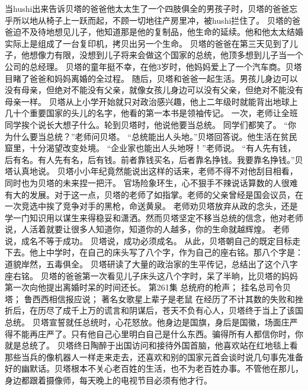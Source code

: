 \documentclass[a4paper,12pt,UTF8,twoside]{ctexbook}
\begin{document}
        当hushi出来告诉贝塔的爸爸他太太生了一个四肢俱全的男孩子时，贝塔的爸爸忘乎所以地从椅子上一跃而起，不顾一切地往产房里冲，被hushi拦住了。  
        贝塔的爸爸迫不及待地想见儿子，他知道那是他的复制品，他生命的延续。他和他太太结婚实际上是组成了一台复印机，拷贝出另一个生命。  
        贝塔的爸爸在第三天见到了儿子，他想像力有限，没想到儿子将来会做这个国家的总统，他顶多想到儿子当一个公司的总经理。  
        贝塔的童年挺不幸，在他3岁时，他妈妈爱上了一个汽车商。贝塔目睹了爸爸和妈妈离婚的全过程。  
        随后，贝塔和爸爸一起生活。男孩儿身边可以没有母亲，但绝对不能没有父亲，就像女孩儿身边可以没有父亲，但绝对不能没有母亲一样。  
        贝塔从上小学开始就只对政治感兴趣，他上二年级时就能背出地球上几十个重要国家的头儿的名字，他看的第一本书是领袖传记。  
        一次，老师让全班同学挨个说长大想子什么。轮到贝塔时，他说他要当总统。  
        同学们都笑了。  
        “你为什么要当总统？”老师问贝塔。  
        “总统能出人头地。”贝塔回答说。他生活在贫民窟里，十分渴望改变处境。  
        “企业家也能出人头地呀！”老师说。  
        “有人先有钱，后有名。有人先有名，后有钱。前者靠钱买名，后者靠名挣钱。我要靠名挣钱。”贝塔认真地说。  
        贝塔小小年纪竟然能说出这样的话来，老师不得不对他刮目相看，同时也为贝塔的未来捏一把汗。  
        官场险象环生，心不狠手不辣说话算数的人很难有大的发展。对于这一点，贝塔的老师了如指掌。老师的父亲曾经是国会议员，在一次竞选中挨了竞争对手的黑枪，命送黄泉。  
        老师劝贝塔放弃从政的念头，还是学一门知识用以谋生来得稳妥和潇洒。然而贝塔坚定不移当总统的信念，他对老师说，人活着就要让很多人知道你，知道你的人越多，你的生命就越辉煌。  
        老师说，成名不等于成功。  
        贝塔说，成功必须成名。  
        从此，贝塔朝自己的既定目标走下去。他上中学时，在自己的床头写了八个字，作为自己的座右铭。那八个字是：道貌岸然，五毒俱全。  
        贝塔研读了大量的政治家的生平传记，总结出了这个八字座右铭。  
        贝塔的爸爸第一次看见儿子床头这八个字时，呆了半晌，比贝塔的妈妈第一次向他提出离婚时呆的时间还长。          第261集  
        总统府的枪声；  
        挂名总司令贝塔；  
        鲁西西相信报应说；  
        著名女歌星上辈子是老鼠    
        在经历了不计其数的失败和挫折后，在历尽了成千上万的谎言和阴谋后，苍天不负有心人，贝塔终于当上了该国总统。  
        贝塔宣誓就任总统时，心花怒放。他身边是国旗，身后是国徽，场面庄严得不能再庄严了。只有他自己心里明白自己是什么东西。骗得所有人都信你时，你就是总统了。  
        贝塔终日陶醉于出国访问和接待外国首脑，他喜欢站在红地毯上看那些当兵的像机器人一样走来走去，还喜欢和别的国家元首会谈时说几句事先准备好的幽默话。贝塔根本不关心老百姓的生活，也不为老百姓办事。不管他在那儿，身边都跟着摄像师，每天晚上的电视节目必须有他才行。  
\end{document}
